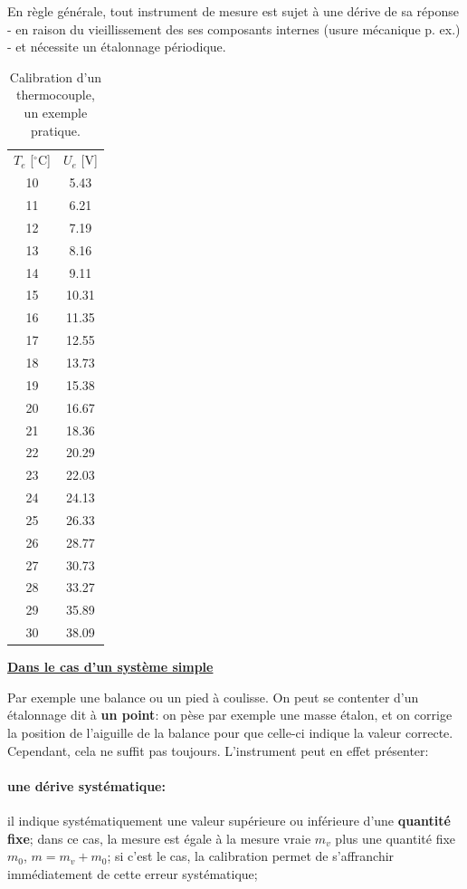 En règle générale, tout instrument de mesure est sujet à une dérive de sa réponse - en raison du vieillissement des ses composants internes (usure mécanique p. ex.) -  et nécessite un étalonnage périodique.

\begin{table}
\vspace{-1.5cm}
\caption{Calibration d'un thermocouple, un exemple pratique.}
\begin{center}
\begin{tabular}{c|c}
$T_e$ [$^\circ$C] & $U_e$ [V] \\
10 &  5.43 \\
11 &  6.21 \\
12 &  7.19 \\
13 &  8.16 \\
14 &  9.11 \\
15 & 10.31 \\
16 & 11.35 \\
17 & 12.55 \\
18 & 13.73 \\
19 & 15.38 \\
20 & 16.67 \\
21 & 18.36 \\
22 & 20.29 \\
23 & 22.03 \\
24 & 24.13 \\
25 & 26.33 \\
26 & 28.77 \\
27 & 30.73 \\
28 & 33.27 \\
29 & 35.89 \\
30 & 38.09
\end{tabular}
\end{center}
\label{tab:tc}
\end{table}

\begin{flushleft}
\underline{\textbf{Dans le cas d'un système simple}}
\end{flushleft}
Par exemple une balance ou un pied à coulisse. On peut se contenter d'un étalonnage dit à \textbf{un point}: on pèse par exemple une masse étalon, et on corrige la position de l'aiguille de la balance pour que celle-ci indique la valeur correcte. Cependant, cela ne suffit pas toujours. L'instrument peut en effet présenter:
\paragraph{une dérive systématique:} il indique systématiquement une valeur supérieure ou inférieure d'une \textbf{quantité fixe}; dans ce cas, la mesure est égale à la mesure vraie $m_v$ plus une quantité fixe $m_0$, $m=m_v+m_0$; si c'est le cas, la calibration permet de s'affranchir immédiatement de cette erreur systématique;
